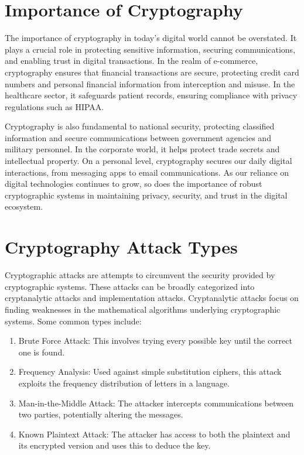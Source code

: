 \documentclass{article}
\begin{document}
\section{Importance of Cryptography}

The importance of cryptography in today's digital world cannot be overstated. It plays a crucial role in protecting sensitive information, securing communications, and enabling trust in digital transactions. In the realm of e-commerce, cryptography ensures that financial transactions are secure, protecting credit card numbers and personal financial information from interception and misuse. In the healthcare sector, it safeguards patient records, ensuring compliance with privacy regulations such as HIPAA.

Cryptography is also fundamental to national security, protecting classified information and secure communications between government agencies and military personnel. In the corporate world, it helps protect trade secrets and intellectual property. On a personal level, cryptography secures our daily digital interactions, from messaging apps to email communications. As our reliance on digital technologies continues to grow, so does the importance of robust cryptographic systems in maintaining privacy, security, and trust in the digital ecosystem.

\section{Cryptography Attack Types}

Cryptographic attacks are attempts to circumvent the security provided by cryptographic systems. These attacks can be broadly categorized into cryptanalytic attacks and implementation attacks. Cryptanalytic attacks focus on finding weaknesses in the mathematical algorithms underlying cryptographic systems. Some common types include:

\begin{enumerate}
    \item Brute Force Attack: This involves trying every possible key until the correct one is found.
    \item Frequency Analysis: Used against simple substitution ciphers, this attack exploits the frequency distribution of letters in a language.
    \item Man-in-the-Middle Attack: The attacker intercepts communications between two parties, potentially altering the messages.
    \item Known Plaintext Attack: The attacker has access to both the plaintext and its encrypted version and uses this to deduce the key.
\end{enumerate}
\end{document}
